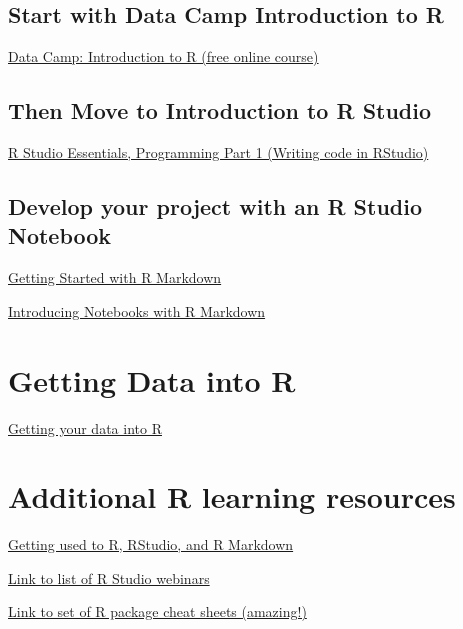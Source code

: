 \documentclass[]{book}
\begin{document}
\subsection{Start with Data Camp Introduction to
R}\label{start-with-data-camp-introduction-to-r}

\href{https://www.datacamp.com/courses/free-introduction-to-r}{Data
Camp: Introduction to R (free online course)}

\subsection{Then Move to Introduction to R
Studio}\label{then-move-to-introduction-to-r-studio}

\href{https://www.rstudio.com/resources/webinars/rstudio-essentials-webinar-series-part-1/}{R
Studio Essentials, Programming Part 1 (Writing code in RStudio)}

\subsection{Develop your project with an R Studio
Notebook}\label{develop-your-project-with-an-r-studio-notebook}

\href{https://www.rstudio.com/resources/webinars/getting-started-with-r-markdown/}{Getting
Started with R Markdown}

\href{https://www.rstudio.com/resources/webinars/introducing-notebooks-with-r-markdown/}{Introducing
Notebooks with R Markdown}

\section{Getting Data into R}\label{getting-data-into-r}

\href{https://www.rstudio.com/resources/webinars/getting-your-data-into-r/}{Getting
your data into R}

\section{Additional R learning
resources}\label{additional-r-learning-resources}

\href{https://bookdown.org/chesterismay/rbasics/}{Getting used to R,
RStudio, and R Markdown}

\href{https://www.rstudio.com/resources/webinars/}{Link to list of R
Studio webinars}

\href{https://www.rstudio.com/resources/cheatsheets/}{Link to set of R
package cheat sheets (amazing!)}
\end{document}

